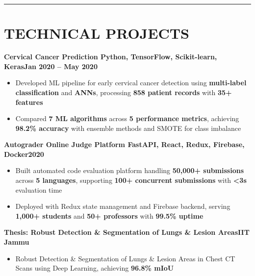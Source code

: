 \documentclass[10pt,a4paper]{article}
\begin{document}
\vspace{2pt}
\noindent\rule{\textwidth}{0.8pt}

\section*{TECHNICAL PROJECTS}

{\small
\noindent
\textbf{Cervical Cancer Prediction \textbf{\textbar{}} Python, TensorFlow, Scikit-learn, Keras}\hfill\textbf{Jan 2020 -- May 2020}
\begin{itemize}[leftmargin=0.3in, itemsep=1.5pt, topsep=0pt, parsep=0pt, partopsep=0pt, label=$\circ$]
    \item Developed ML pipeline for early cervical cancer detection using \textbf{multi-label classification} and \textbf{ANNs}, processing \textbf{858 patient records} with \textbf{35+ features}
    \item Compared \textbf{7 ML algorithms} across \textbf{5 performance metrics}, achieving \textbf{98.2\% accuracy} with ensemble methods and SMOTE for class imbalance
\end{itemize}

\vspace{2pt}
\noindent
\textbf{Autograder Online Judge Platform \textbf{\textbar{}} FastAPI, React, Redux, Firebase, Docker}\hfill\textbf{2020}
\begin{itemize}[leftmargin=0.3in, itemsep=1.5pt, topsep=0pt, parsep=0pt, partopsep=0pt, label=$\circ$]
    \item Built automated code evaluation platform handling \textbf{50,000+ submissions} across \textbf{5 languages}, supporting \textbf{100+ concurrent submissions} with \textbf{<3s} evaluation time
    \item Deployed with Redux state management and Firebase backend, serving \textbf{1,000+ students} and \textbf{50+ professors} with \textbf{99.5\% uptime}
\end{itemize}

\vspace{2pt}
\noindent
\textbf{Thesis: Robust Detection \& Segmentation of Lungs \& Lesion Areas}\hfill\textbf{IIT Jammu}
\begin{itemize}[leftmargin=0.3in, itemsep=1.5pt, topsep=0pt, parsep=0pt, partopsep=0pt, label=$\circ$]
    \item Robust Detection \& Segmentation of Lungs \& Lesion Areas in Chest CT Scans using Deep Learning, achieving \textbf{96.8\% mIoU}
\end{itemize}
}
\end{document}
